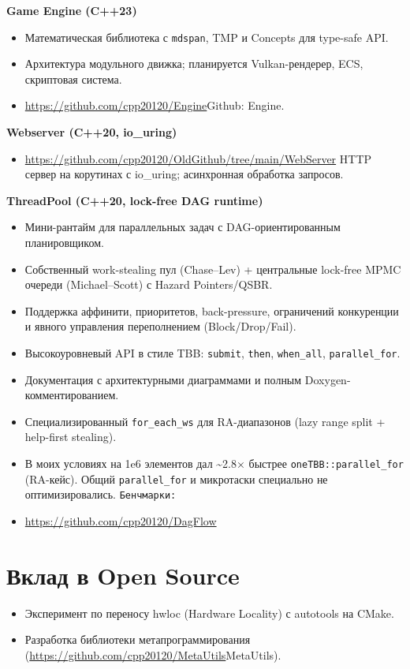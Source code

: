 \documentclass[a4paper,10pt]{article}
\begin{document}
\textbf{Game Engine (C++23)}  
\begin{itemize}[noitemsep]
    \item Математическая библиотека с \texttt{mdspan}, TMP и Concepts для type-safe API.
    \item Архитектура модульного движка; планируется Vulkan-рендерер, ECS, скриптовая система.
    \item \url{https://github.com/cpp20120/Engine}{Github: Engine}.
\end{itemize}

\textbf{Webserver (C++20, io\_uring)}  
\begin{itemize}[noitemsep]
    \item \url{https://github.com/cpp20120/OldGithub/tree/main/WebServer} HTTP сервер на корутинах с io\_uring; асинхронная обработка запросов.
\end{itemize}

\textbf{ThreadPool (C++20, lock-free DAG runtime)}  
\begin{itemize}[noitemsep]
    \item Мини-рантайм для параллельных задач с DAG-ориентированным планировщиком.
    \item Собственный work-stealing пул (Chase–Lev) + центральные lock-free MPMC очереди (Michael–Scott) с Hazard Pointers/QSBR.
    \item Поддержка аффинити, приоритетов, back-pressure, ограничений конкуренции и явного управления переполнением (Block/Drop/Fail).
    \item Высокоуровневый API в стиле TBB: \texttt{submit}, \texttt{then}, \texttt{when\_all}, \texttt{parallel\_for}.
    \item Документация с архитектурными диаграммами и полным Doxygen-комментированием.
    \item Специализированный \texttt{for\_each\_ws} для RA-диапазонов (lazy range split + help-first stealing). 
    \item В моих условиях на 1e6 элементов дал \textasciitilde{}2{.}8× быстрее \texttt{oneTBB::parallel\_for} (RA-кейс). Общий \texttt{parallel\_for} и микротаски специально не оптимизировались.
    \texttt{Бенчмарки:}
    \item \url{https://github.com/cpp20120/DagFlow}
\end{itemize}

\section*{Вклад в Open Source}
\begin{itemize}[noitemsep]
    \item Эксперимент по переносу hwloc (Hardware Locality) с autotools на CMake.
    \item Разработка библиотеки метапрограммирования (\url{https://github.com/cpp20120/MetaUtils}{MetaUtils}).
\end{itemize}
\end{document}
